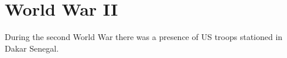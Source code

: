
\chapter{World War II}  

During the second World War there was a presence of US troops stationed in Dakar Senegal.

